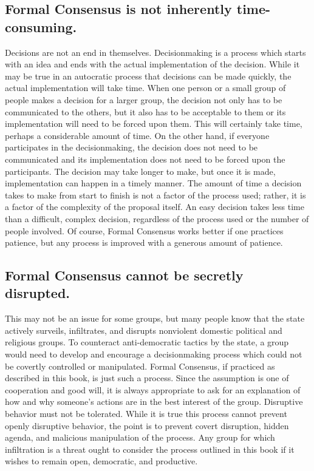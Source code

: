 \subsection*{Formal Consensus is not inherently time-consuming.}
Decisions are not an end in themselves. Decisionmaking is a
process which starts with an idea and ends with the actual
implementation of the decision. While it may be true in an
autocratic process that decisions can be made quickly, the actual
implementation will take time. When one person or a small group of
people makes a decision for a larger group, the decision not only
has to be communicated to the others, but it also has to be
acceptable to them or its implementation will need to be forced
upon them. This will certainly take time, perhaps a considerable
amount of time. On the other hand, if everyone participates in the
decisionmaking, the decision does not need to be communicated and
its implementation does not need to be forced upon the
participants. The decision may take longer to make, but once it is
made, implementation can happen in a timely manner. The amount of
time a decision takes to make from start to finish is not a factor
of the process used; rather, it is a factor of the complexity of
the proposal itself. An easy decision takes less time than a
difficult, complex decision, regardless of the process used or the
number of people involved. Of course, Formal Consensus works
better if one practices patience, but any process is improved with
a generous amount of patience.

\subsection*{Formal Consensus cannot be secretly disrupted.}

This may not be an issue for some groups, but many people know
that the state actively surveils, infiltrates, and disrupts
nonviolent domestic political and religious groups. To counteract
anti-democratic tactics by the state, a group would need to develop
and encourage a decisionmaking process which could not be covertly
controlled or manipulated. Formal Consensus, if practiced as
described in this book, is just such a process. Since the
assumption is one of cooperation and good will, it is always
appropriate to ask for an explanation of how and why someone's
actions are in the best interest of the group. Disruptive behavior
must not be tolerated. While it is true this process cannot
prevent openly disruptive behavior, the point is to prevent covert
disruption, hidden agenda, and malicious manipulation of the
process. Any group for which infiltration is a threat ought to
consider the process outlined in this book if it wishes to remain
open, democratic, and productive.
